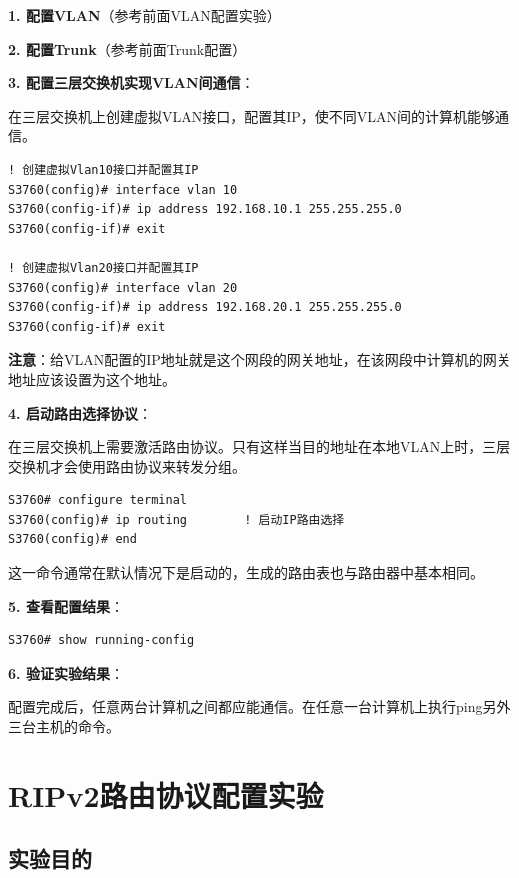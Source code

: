 \documentclass[12pt,a4paper]{ctexart}
\begin{document}
\begin{cmdbox}
\textbf{1. 配置VLAN}（参考前面VLAN配置实验）

\textbf{2. 配置Trunk}（参考前面Trunk配置）

\textbf{3. 配置三层交换机实现VLAN间通信}：

在三层交换机上创建虚拟VLAN接口，配置其IP，使不同VLAN间的计算机能够通信。

\begin{lstlisting}
! 创建虚拟Vlan10接口并配置其IP
S3760(config)# interface vlan 10
S3760(config-if)# ip address 192.168.10.1 255.255.255.0
S3760(config-if)# exit

! 创建虚拟Vlan20接口并配置其IP
S3760(config)# interface vlan 20
S3760(config-if)# ip address 192.168.20.1 255.255.255.0
S3760(config-if)# exit
\end{lstlisting}

\textbf{注意}：给VLAN配置的IP地址就是这个网段的网关地址，在该网段中计算机的网关地址应该设置为这个地址。

\textbf{4. 启动路由选择协议}：

在三层交换机上需要激活路由协议。只有这样当目的地址在本地VLAN上时，三层交换机才会使用路由协议来转发分组。

\begin{lstlisting}
S3760# configure terminal
S3760(config)# ip routing        ! 启动IP路由选择
S3760(config)# end
\end{lstlisting}

这一命令通常在默认情况下是启动的，生成的路由表也与路由器中基本相同。

\textbf{5. 查看配置结果}：
\begin{lstlisting}
S3760# show running-config
\end{lstlisting}

\textbf{6. 验证实验结果}：

配置完成后，任意两台计算机之间都应能通信。在任意一台计算机上执行ping另外三台主机的命令。
\end{cmdbox}


\section{RIPv2路由协议配置实验}

\subsection{实验目的}
\end{document}
